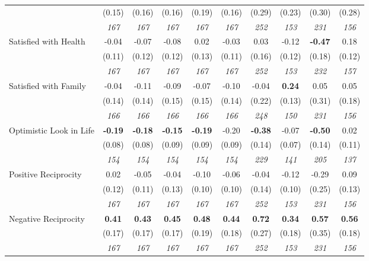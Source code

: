\begin{tabular}{l c c c c c c c c c}
& (0.15) & (0.16) & (0.16) & (0.19) & (0.16) & (0.29) & (0.23) & (0.30) & (0.28) \\
& \textit{ 167 } & \textit{ 167 } & \textit{ 167 } & \textit{ 167 } & \textit{ 167 } & \textit{ 252 } & \textit{ 153 } & \textit{ 231 } & \textit{ 156 } \\
Satisfied with Health & -0.04 & -0.07 & -0.08 & 0.02 & -0.03 & 0.03 & -0.12 & \textbf{ -0.47 } & 0.18 \\
& (0.11) & (0.12) & (0.12) & (0.13) & (0.11) & (0.16) & (0.12) & (0.18) & (0.12) \\
& \textit{ 167 } & \textit{ 167 } & \textit{ 167 } & \textit{ 167 } & \textit{ 167 } & \textit{ 252 } & \textit{ 153 } & \textit{ 232 } & \textit{ 157 } \\
Satisfied with Family & -0.04 & -0.11 & -0.09 & -0.07 & -0.10 & -0.04 & \textbf{0.24} & 0.05 & 0.05 \\
& (0.14) & (0.14) & (0.15) & (0.15) & (0.14) & (0.22) & (0.13) & (0.31) & (0.18) \\
& \textit{ 166 } & \textit{ 166 } & \textit{ 166 } & \textit{ 166 } & \textit{ 166 } & \textit{ 248 } & \textit{ 150 } & \textit{ 231 } & \textit{ 156 } \\
Optimistic Look in Life & \textbf{ -0.19 } & \textbf{ -0.18 } & \textbf{ -0.15 } & \textbf{-0.19} & -0.20 & \textbf{ -0.38 } & -0.07 & \textbf{ -0.50 } & 0.02 \\
& (0.08) & (0.08) & (0.09) & (0.09) & (0.09) & (0.14) & (0.07) & (0.14) & (0.11) \\
& \textit{ 154 } & \textit{ 154 } & \textit{ 154 } & \textit{ 154 } & \textit{ 154 } & \textit{ 229 } & \textit{ 141 } & \textit{ 205 } & \textit{ 137 } \\
Positive Reciprocity & 0.02 & -0.05 & -0.04 & -0.10 & -0.06 & -0.04 & -0.12 & -0.29 & 0.09 \\
& (0.12) & (0.11) & (0.13) & (0.10) & (0.10) & (0.14) & (0.10) & (0.25) & (0.13) \\
& \textit{ 167 } & \textit{ 167 } & \textit{ 167 } & \textit{ 167 } & \textit{ 167 } & \textit{ 252 } & \textit{ 153 } & \textit{ 231 } & \textit{ 156 } \\
Negative Reciprocity & \textbf{ 0.41 } & \textbf{ 0.43 } & \textbf{ 0.45 } & \textbf{0.48} & \textbf{0.44} & \textbf{ 0.72 } & \textbf{0.34} & \textbf{ 0.57 } & \textbf{0.56} \\
& (0.17) & (0.17) & (0.17) & (0.19) & (0.18) & (0.27) & (0.18) & (0.35) & (0.18) \\
& \textit{ 167 } & \textit{ 167 } & \textit{ 167 } & \textit{ 167 } & \textit{ 167 } & \textit{ 252 } & \textit{ 153 } & \textit{ 231 } & \textit{ 156 } \\
\bottomrule
\end{tabular}
